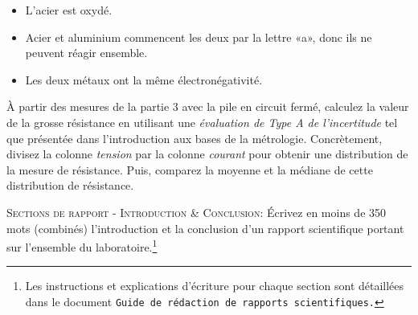 \documentclass[canadien,12pt,oneside,letterpaper]{article}
\begin{document}
\begin{gradescope}
\begin{gradescope}
\begin{itemize}[label=$\blacktriangleright$]
        \item L'acier est oxydé.
        \item Acier et aluminium commencent les deux par la lettre «a», donc ils ne peuvent réagir ensemble.
        \item Les deux métaux ont la même électronégativité.
        \end{itemize}
    \end{gradescope}
\item À partir des mesures de la partie 3 avec la pile en circuit fermé, calculez la valeur de la grosse résistance en utilisant une \textit{évaluation de Type A de l'incertitude} tel que présentée dans l’introduction aux bases de la métrologie. Concrètement, divisez la colonne \textit{tension} par la colonne \textit{courant} pour obtenir une distribution de la mesure de résistance. Puis, comparez la moyenne et la médiane de cette distribution de résistance.%
\item \textsc{Sections de rapport - Introduction \& Conclusion:} Écrivez en moins de 350 mots (combinés) l'introduction et la conclusion d'un rapport scientifique portant sur l'ensemble du laboratoire.\footnote{Les instructions et explications d'écriture pour chaque section sont détaillées dans le document \texttt{Guide de rédaction de rapports scientifiques.}}
\end{gradescope}
\end{document}
